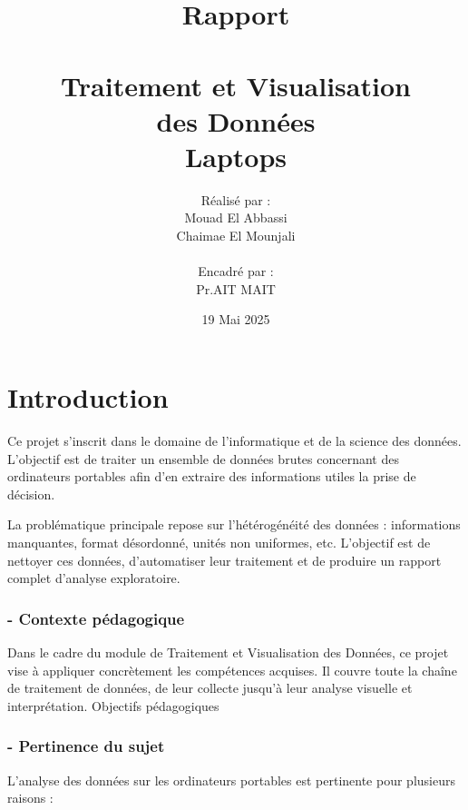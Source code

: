 \documentclass[12pt]{report}
\title{\Huge \textbf{ Rapport \\[0.5em]\\[0.5em] Traitement et Visualisation \\ des Donn\'ees \\ Laptops }}
\author{\Large Réalisé par :  \\ [0.5em] Mouad El Abbassi \\ Chaimae El Mounjali \\[0.5em]
        \\ Encadr\'e par : \\[0.5em] Pr.AIT MAIT \\ [0.5em]}
\date{19 Mai 2025}
\begin{document}
\maketitle
\tableofcontents
\newpage


\chapter*{Introduction}
Ce projet s'inscrit dans le domaine de l'informatique et de la science des donn\'ees. L'objectif est de traiter un ensemble de donn\'ees brutes concernant des ordinateurs portables afin d'en extraire des informations utiles \a la prise de d\'ecision.

La probl\'ematique principale repose sur l'h\'et\'erog\'en\'eit\'e des donn\'ees : informations manquantes, format d\'esordonn\'e, unit\'es non uniformes, etc. L'objectif est de nettoyer ces donn\'ees, d'automatiser leur traitement et de produire un rapport complet d'analyse exploratoire. \\

\subsection*{- Contexte pédagogique }
Dans  le cadre du  module  de  Traitement  et  Visualisation  des  Données,  ce  projet vise à 
appliquer concrètement  les compétences  acquises. Il couvre toute  la chaîne de traitement 
de données, de leur collecte jusqu’à leur analyse visuelle et interprétation.
Objectifs pédagogiques\\

\subsection*{- Pertinence du sujet}

L'analyse des données sur les ordinateurs portables est pertinente pour plusieurs raisons :
\end{document}
